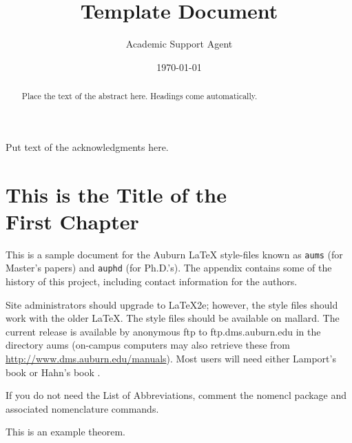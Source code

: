 \documentclass{article}
\title{Template Document}
\author{Academic Support Agent}
\date{\today}
\begin{document}
\maketitle

\begin{romanpages}      %

\TitlePage 

\begin{abstract} 
Place the text of the abstract here. Headings come automatically.
\end{abstract}

\begin{acknowledgments}
Put text of the acknowledgments here.
\end{acknowledgments}





\printnomenclature[0.5in] %
\end{romanpages}        %


\normalem       %


\chapter{This is the Title of the\\ First Chapter}  %

This is a sample document for the Auburn  \LaTeX{} style-files known
as {\tt aums} (for Master's papers) and {\tt auphd} (for Ph.D.'s).
The appendix contains some of the history of this project, including
contact information for the authors. 

Site administrators should upgrade to \LaTeX2e; however, the style files
should work with the older \LaTeX.  The style files should be available
on mallard.  The current release is available by anonymous ftp to
ftp.dms.auburn.edu in the directory aums (on-campus computers may
also retrieve these from \url{http://www.dms.auburn.edu/manuals}).
Most users will need either Lamport's book \cite{lamport} or Hahn's book
\cite{hahn}.

If you do not need the List of Abbreviations, comment the nomencl package and associated nomenclature commands. 
\begin{theorem} This is an example theorem.
\end{theorem}
\end{document}
